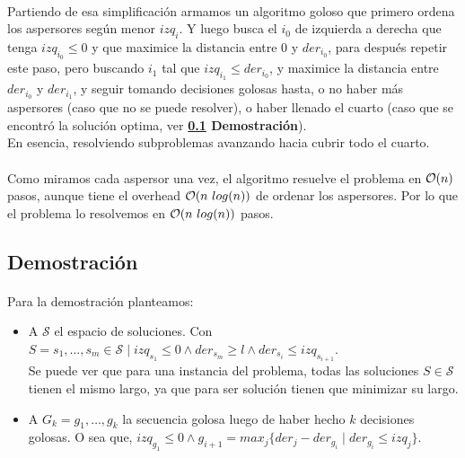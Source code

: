 \documentclass[./main.tex]{subfiles}
\begin{document}

\paragraph{} Partiendo de esa simplificación armamos un algoritmo goloso que primero ordena los aspersores según menor \(izq_i\). Y luego busca el \(i_0\) de izquierda a derecha que tenga \(izq_{i_0} \leq 0\) y que maximice la distancia entre 0 y \(der_{i_0}\), para después repetir este paso, pero buscando \(i_1\) tal que \(izq_{i_1} \leq der_{i_0}\), y maximice la distancia entre \(der_{i_0}\) y \(der_{i_1}\), y seguir tomando decisiones golosas hasta, o no haber más aspersores (caso que no se puede resolver), o haber llenado el cuarto (caso que se encontró la solución optima, ver \textbf{\ref{sec:ej2-dem} Demostración}). \\
En esencia, resolviendo subproblemas avanzando hacia cubrir todo el cuarto.

\paragraph{} Como miramos cada aspersor una vez, el algoritmo resuelve el problema en \(\mathcal{O}(n)\) pasos, aunque tiene el overhead \(\mathcal{O}(n\ log(n))\) de ordenar los aspersores. Por lo que el problema lo resolvemos en \(\mathcal{O}(n\ log(n))\) pasos. %

\subsection{Demostración}
\label{sec:ej2-dem}

\paragraph{} Para la demostración planteamos:
\begin{itemize}
  \item A \(\mathcal{S}\) el espacio de soluciones. Con \(S = s_1, \ldots, s_m \in \mathcal{S} \mid izq_{s_1} \leq 0 \land der_{s_m} \geq l \land der_{s_i} \leq izq_{s_{i+1}}\). \\
  Se puede ver que para una instancia del problema, todas las soluciones \(S \in \mathcal{S}\) tienen el mismo largo, ya que para ser solución tienen que minimizar su largo. 
  \item A \(G_k = g_1, \ldots, g_k\) la secuencia golosa luego de haber hecho \(k\) decisiones golosas. O sea que, \(izq_{g_1} \leq 0 \land g_{i+1} = max_j\{der_j - der_{g_i} \mid der_{g_i} \leq izq_j\}\).
\end{itemize}
\end{document}
